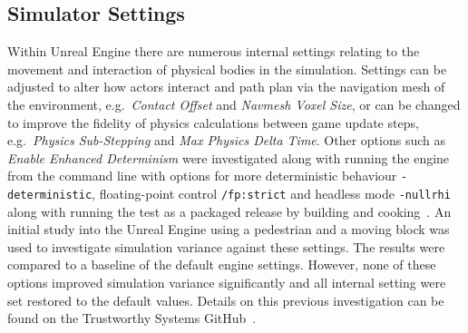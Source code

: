 \documentclass[runningheads,twocolumn,a4paper,10pt]{llncs}
\begin{document}




\subsection{Simulator Settings}

Within Unreal Engine there are numerous internal settings relating to the movement and interaction of physical bodies in the simulation. Settings can be adjusted to alter how actors interact and path plan via the navigation mesh of the environment, e.g.\ \textit{Contact Offset} and \textit{Navmesh Voxel Size}, or can be changed to improve the fidelity of physics calculations between game update steps, e.g.\ \textit{Physics Sub-Stepping} and \textit{Max Physics Delta Time}. Other options such as \textit{Enable Enhanced Determinism} were investigated along with running the engine from the command line with options for more deterministic behaviour \texttt{-deterministic}, floating-point control \texttt{/fp:strict} and headless mode \texttt{-nullrhi} along with running the test as a packaged release by building and cooking~\cite{releasing_project}.
An initial study into the Unreal Engine using a pedestrian and a moving block was used to investigate simulation variance against these settings. The results were compared to a baseline of the default engine settings. 
%
However, none of these options improved simulation variance significantly and all internal setting were set restored to the default values. Details on this previous investigation can be found on the Trustworthy Systems GitHub~\cite{TSLUnrealEngineTesting}. 
\end{document}
